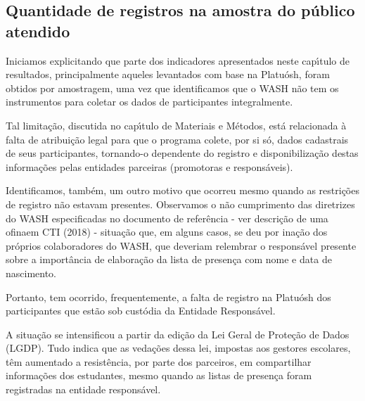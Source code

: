 \documentclass[
12pt,		%
openright,	%
twoside,  %
a4paper,			%
chapter=TITLE,		%
english,			%
french,				%
spanish,			%
brazil				%
]{USPSC-classe/USPSC}
\begin{document}
\subsection[Quantidade de registros na amostra do p\'ublico atendido]{Quantidade de registros na amostra do p\'ublico atendido}\label{Quantidade de registros na amostra do p\'ublico atendido}
Iniciamos explicitando que parte dos indicadores apresentados neste cap\'{\i}tulo de resultados, principalmente aqueles levantados com base na Platu\'osh, foram obtidos por amostragem, uma vez que identificamos que o WASH n\~ao tem os instrumentos para coletar os dados de participantes integralmente.










Tal limita\c{c}\~ao, discutida no cap\'{\i}tulo de Materiais e M\'etodos, est\'a relacionada \`a falta de atribui\c{c}\~ao legal para que o programa colete, por si s\'o, dados cadastrais de seus participantes, tornando-o dependente do registro e disponibiliza\c{c}\~ao destas informa\c{c}\~oes pelas entidades parceiras (promotoras e respons\'aveis).










Identificamos, tamb\'em, um outro motivo que ocorreu mesmo quando as restri\c{c}\~oes de registro n\~ao estavam presentes. Observamos o n\~ao cumprimento das diretrizes do WASH especificadas no documento de refer\^encia - ver \textquotedbl descri\c{c}\~ao de uma ofina\textquotedbl  em  CTI (2018) - situa\c{c}\~ao que, em alguns casos, se deu por ina\c{c}\~ao dos pr\'oprios colaboradores do WASH, que deveriam relembrar o respons\'avel presente sobre a import\^ancia de elabora\c{c}\~ao da lista de presen\c{c}a com nome e data de nascimento.










Portanto, tem ocorrido, frequentemente, a falta de registro na Platu\'osh dos participantes que est\~ao sob cust\'odia da Entidade Respons\'avel.










A situa\c{c}\~ao se intensificou a partir da edi\c{c}\~ao da Lei Geral de Prote\c{c}\~ao de Dados (LGDP). Tudo indica que as veda\c{c}\~oes dessa lei, impostas aos gestores escolares, t\^em aumentado a resist\^encia, por parte dos parceiros, em compartilhar informa\c{c}\~oes dos estudantes, mesmo quando as listas de presen\c{c}a foram registradas na entidade respons\'avel.
\end{document}
